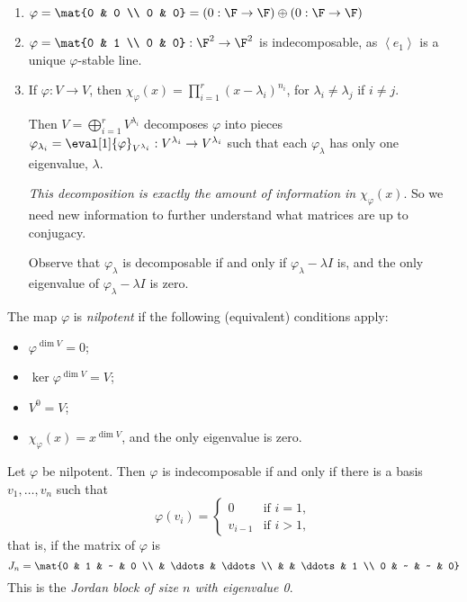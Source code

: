 \begin{examples}
\mbox{}
\begin{enumerate}
	\item $\varphi=\mat{0 & 0 \\ 0 & 0} = (0:\F\to\F) \oplus (0:\F\to\F)$
	\item $\varphi=\mat{0 & 1 \\ 0 & 0}:\F^2\to\F^2$ is indecomposable, as $\left\langle e_1 \right\rangle$ is a unique $\varphi$-stable line.
	\item If $\varphi:V\to V$, then $\chi_\varphi(x) = \prod_{i=1}^r \left( x-\lambda_i \right)^{n_i}$, for $\lambda_i\neq \lambda_j$ if $i\neq j$.
	
	Then $V=\bigoplus_{i=1}^r V^{\lambda_i}$ decomposes $\varphi$ into pieces $\varphi_{\lambda_i} = \eval[1]{\varphi}_{V^{\lambda_i}}:V^{\lambda_i} \to V^{\lambda_i}$ such that each $\varphi_\lambda$ has only one eigenvalue, $\lambda$. 

	\emph{This decomposition is exactly the amount of information in} $\chi_\varphi(x)$. So we need new information to further 
	understand what matrices are up to conjugacy.

	Observe that $\varphi_\lambda$ is decomposable if and only if $\varphi_\lambda-\lambda I$ is, and the only eigenvalue of $\varphi_\lambda-\lambda I$ is zero.
\end{enumerate}
\end{examples}

\begin{definition}
	The map $\varphi$ is \emph{nilpotent} if the following (equivalent) conditions apply:
	\begin{itemize}
		\shortskip
		\item $\varphi^{\dim V} = 0$;
		\item $\ker\varphi^{\dim V}=V$;
		\item $V^0=V$;
		\item $\chi_\varphi(x) = x^{\dim V}$, and the only eigenvalue is zero.
	\end{itemize}
\end{definition}

	\pagebreak

\begin{theorem}
	Let $\varphi$ be nilpotent. Then $\varphi$ is indecomposable if and only if there is a basis $v_1,\ldots,v_n$ such that
	\begin{equation*}
		\varphi(v_i) =
		\begin{cases}
			0 & \text{if } i=1, \\
			v_{i-1} & \text{if } i>1,
		\end{cases}
	\end{equation*}
	that is, if the matrix of $\varphi$ is
	\renewcommand{\arraystretch}{1.0}
	\begin{equation*}
		J_n = \mat{0 & 1 & ~ & 0 \\ & \ddots & \ddots \\ & & \ddots & 1 \\ 0 & ~ & ~ & 0}
	\end{equation*}
	\drangarray
	This is the \emph{Jordan block of size $n$ with eigenvalue 0}.
	\label{thm:jordan-1}
\end{theorem}

